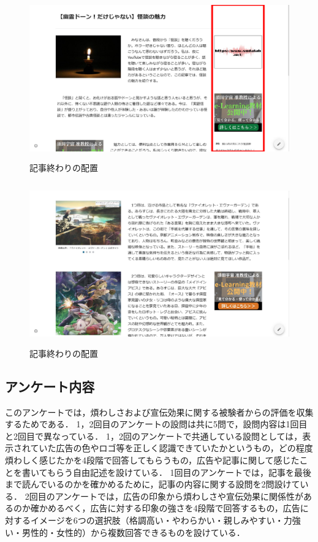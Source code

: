 \documentclass[12pt,a4j,titlepage]{ltjsarticle}
\begin{document}
\begin{figure}[H]
\begin{center}
 \includegraphics[height=70mm]{figures/明朝体.pdf}
\end{center}
 \caption{記事終わりの配置}
 \label{fig:明朝体}
\end{figure}

\begin{figure}[H]
\begin{center}
 \includegraphics[height=70mm]{figures/丸ゴシック体.pdf}
\end{center}
 \caption{記事終わりの配置}
 \label{fig:丸ゴシック体}
\end{figure}

\subsection{アンケート内容}
このアンケートでは，煩わしさおよび宣伝効果に関する被験者からの評価を収集するためである．
1，2回目のアンケートの設問は共に5問で，設問内容は1回目と2回目で異なっている．
1，2回のアンケートで共通している設問としては，表示されていた広告の色やロゴ等を正しく認識できていたかというもの，どの程度煩わしく感じたかを4段階で回答してもらうもの，広告や記事に関して感じたことを書いてもらう自由記述を設けている．
1回目のアンケートでは，記事を最後まで読んでいるのかを確かめるために，記事の内容に関する設問を2問設けている．
2回目のアンケートでは，広告の印象から煩わしさや宣伝効果に関係性があるのか確かめるべく，広告に対する印象の強さを4段階で回答するもの，広告に対するイメージを6つの選択肢（格調高い・やわらかい・親しみやすい・力強い・男性的・女性的）から複数回答できるものを設けている．
\end{document}
